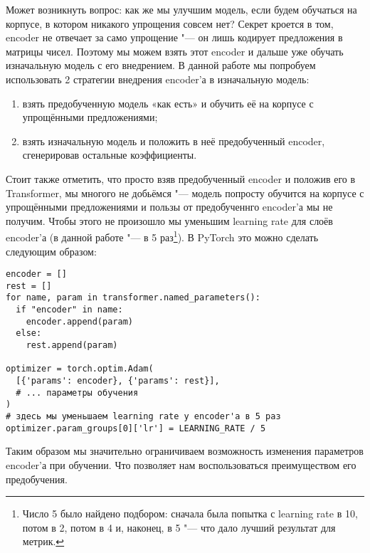 Может возникнуть вопрос: как же мы улучшим модель, если будем обучаться на корпусе, в котором никакого упрощения совсем нет?
Секрет кроется в том, encoder не отвечает за само упрощение "--- он лишь кодирует предложения в матрицы чисел.
Поэтому мы можем взять этот encoder и дальше уже обучать изначальную модель с его внедрением.
В данной работе мы попробуем использовать 2 стратегии внедрения encoder'а в изначальную модель:
\begin{enumerate}[1.]%
  \item взять предобученную модель «как есть» и обучить её на корпусе с упрощёнными предложениями;
  \item взять изначальную модель и положить в неё предобученный encoder, сгенерировав остальные коэффициенты.
\end{enumerate}

Стоит также отметить, что просто взяв предобученный encoder и положив его в Transformer, мы многого не добьёмся "--- модель попросту обучится на корпусе с упрощёнными предложениями и пользы от предобученнго encoder'а мы не получим.
Чтобы этого не произошло мы уменьшим learning rate для слоёв encoder'а (в данной работе "--- в 5 раз\footnote{Число 5 было найдено подбором: сначала была попытка с learning rate в 10, потом в 2, потом в 4 и, наконец, в 5 "--- что дало лучший результат для метрик.}).
В PyTorch это можно сделать следующим образом:
\begin{verbatim}
encoder = []
rest = []
for name, param in transformer.named_parameters():
  if "encoder" in name:
    encoder.append(param)
  else:
    rest.append(param)

optimizer = torch.optim.Adam(
  [{'params': encoder}, {'params': rest}],
  # ... параметры обучения
)
# здесь мы уменьшаем learning rate у encoder'а в 5 раз
optimizer.param_groups[0]['lr'] = LEARNING_RATE / 5
\end{verbatim}

Таким образом мы значительно ограничиваем возможность изменения параметров encoder'а при обучении.
Что позволяет нам воспользоваться преимуществом его предобучения.
